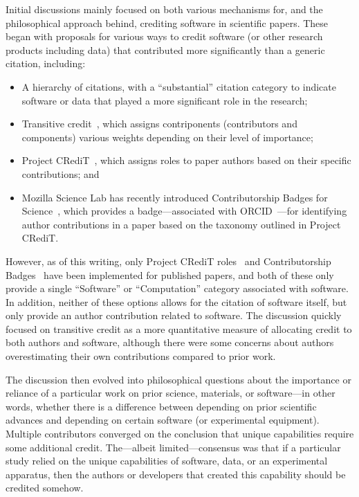 Initial discussions mainly focused on both various mechanisms for, and the
philosophical approach behind, crediting software in scientific papers. These
began with proposals for various ways to credit software (or other research
products including data) that contributed more significantly than a generic
citation, including:
\begin{itemize}

\item A hierarchy of citations, with a ``substantial'' citation category to
indicate software or data that played a more significant role in the research;

\item Transitive credit~\cite{wssspe2_katz,Katz:2014_tc}, which assigns
contriponents (contributors and components) various weights depending on their
level of importance;
    
\item Project CRediT~\cite{projectcredit}, which assigns roles to paper authors
based on their specific contributions; and
    
\item Mozilla Science Lab has recently introduced Contributorship Badges for
Science~\cite{Mozilla_badges}, which provides a badge---associated with
ORCID~\cite{orcid}---for identifying author contributions in a paper based on the taxonomy
outlined in Project CRediT.
    
\end{itemize}
However, as of this writing, only Project CRediT
roles~\cite{McCall2015_credit,Lin2015_credit} and Contributorship
Badges~\cite{Mozilla_badges} have been implemented for published papers, and
both of these only provide a single ``Software'' or ``Computation'' category
associated with software. In addition, neither of these options allows for the
citation of software itself, but only provide an author contribution related to
software. The discussion quickly focused on transitive credit as a more
quantitative measure of allocating credit to both authors and software, although
there were some concerns about authors overestimating their own contributions
compared to prior work.

The discussion then evolved into philosophical questions about the importance or
reliance of a particular work on prior science, materials, or software---in
other words, whether there is a difference between depending on prior scientific
advances and depending on certain software (or experimental equipment).
Multiple contributors converged on the conclusion that unique capabilities
require some additional credit. The---albeit limited---consensus was that if a
particular study relied on the unique capabilities of software, data, or an
experimental apparatus, then the authors or developers that created this
capability should be credited somehow.

